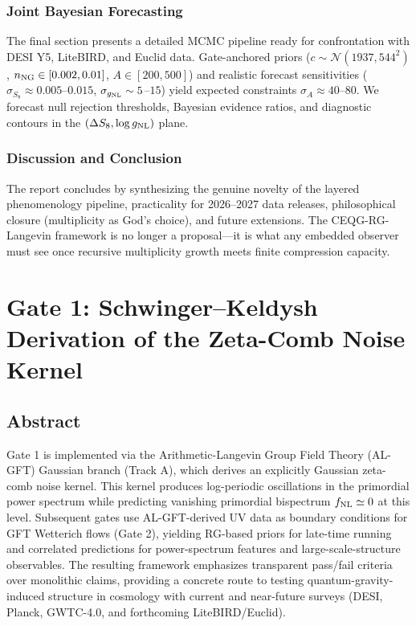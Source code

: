 \documentclass[11pt,a4paper,twoside]{article}
\begin{document}
\subsection{Joint Bayesian Forecasting}
The final section presents a detailed MCMC pipeline ready for confrontation with DESI Y5, LiteBIRD, and Euclid data. Gate-anchored priors ($c \sim \mathcal{N}(1937, 544^2)$, $n_{\rm NG} \in [0.002, 0.01]$, $A \in [200, 500]$) and realistic forecast sensitivities ($\sigma_{S_8} \approx 0.005$--$0.015$, $\sigma_{g_{\rm NL}} \sim 5$--$15$) yield expected constraints $\sigma_A \approx 40$--$80$. We forecast null rejection thresholds, Bayesian evidence ratios, and diagnostic contours in the $(\Delta S_8, \log g_{\rm NL})$ plane.

\subsection{Discussion and Conclusion}
The report concludes by synthesizing the genuine novelty of the layered phenomenology pipeline, practicality for 2026–2027 data releases, philosophical closure (multiplicity as God’s choice), and future extensions. The CEQG-RG-Langevin framework is no longer a proposal—it is what any embedded observer must see once recursive multiplicity growth meets finite compression capacity.
 

\chapter{Gate 1: Schwinger–Keldysh Derivation of the Zeta-Comb Noise Kernel}

\section{Abstract}
Gate 1 is implemented via the Arithmetic-Langevin Group Field Theory (AL-GFT) Gaussian branch (Track A), which derives an explicitly Gaussian zeta-comb noise kernel. This kernel produces log-periodic oscillations in the primordial power spectrum while predicting vanishing primordial bispectrum $f_{\rm NL} \simeq 0$ at this level. Subsequent gates use AL-GFT-derived UV data as boundary conditions for GFT Wetterich flows (Gate 2), yielding RG-based priors for late-time running and correlated predictions for power-spectrum features and large-scale-structure observables. The resulting framework emphasizes transparent pass/fail criteria over monolithic claims, providing a concrete route to testing quantum-gravity-induced structure in cosmology with current and near-future surveys (DESI, Planck, GWTC-4.0, and forthcoming LiteBIRD/Euclid).
\end{document}
